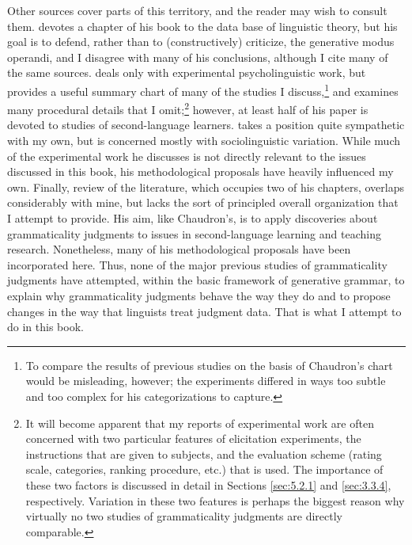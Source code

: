 Other sources cover parts of this territory, and the reader may wish to consult them. \citet{Newmeyer1983} devotes a chapter of his book to the data base of linguistic theory, but his goal is to defend, rather than to (constructively) criticize, the generative modus operandi, and I disagree with many of his conclusions, although I cite many of the same sources. \citet{Chaudron1983} deals only with experimental psycholinguistic  work, but provides  a useful  summary  chart of many of the studies I discuss,\footnote{To compare the results of previous studies on the basis of Chaudron's chart would be misleading, however; the experiments differed in ways too subtle and too complex for his categorizations to capture.} and examines many procedural details that I omit;\footnote{It will become apparent that my reports of experimental work are often concerned with two particular features of elicitation experiments, the instructions that are given to subjects, and the evaluation scheme (rating scale, categories, ranking procedure, etc.) that is used. The importance of these two factors is discussed in detail in Sections \ref{sec:5.2.1} and \ref{sec:3.3.4},
respectively. Variation in these two features is perhaps the biggest reason why virtually no two studies of grammaticality judgments are directly comparable.} however,
at least half of his paper is devoted to studies of second-language learners. \citet{Labov1975} takes a position quite sympathetic with my own, but is concerned mostly with sociolinguistic variation. While much of the experimental work he discusses is not directly relevant to the issues discussed in this book, his methodological proposals have heavily influenced my own. Finally,  review of the literature, which occupies two of his chapters, overlaps considerably with mine, but lacks the sort of principled overall organization that I attempt to provide. His aim, like Chaudron's, is to apply discoveries about grammaticality judgments to issues in second-language learning and teaching research. Nonetheless, many of his methodological proposals have been incorporated here. Thus, none of the major previous studies of grammaticality judgments have attempted, within the basic framework of generative grammar, to explain why grammaticality judgments behave the way they do and to propose changes in the way that linguists treat judgment data. That is what I attempt to do in this book.

